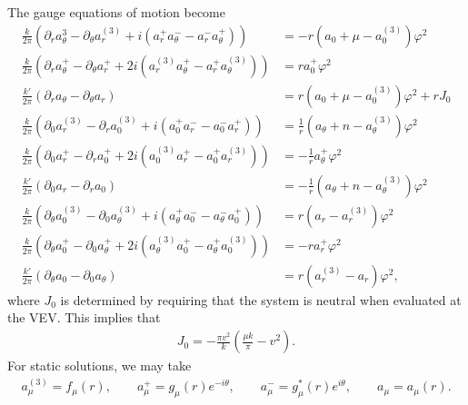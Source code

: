     The gauge equations of motion become
    \begin{align}
        \frac{k}{2 \pi} \left(\partial_{r} a_{\theta}^3 - \partial_{\theta} a_r^{(3)} + i \left(a_r^+ a_{\theta}^- - a_r^- a_{\theta}^{+} \right) \right) &= -r \left( a_0 + \mu - a^{(3)}_0 \right)\varphi^2 \\
        \frac{k}{2 \pi} \left(\partial_r a_{\theta}^{+} - \partial_{\theta} a_r^{+} +2i \left(a_r^{(3)} a_{\theta}^{+} - a_r^{+} a_{\theta}^{(3)} \right) \right) &=r a_0^{+} \varphi^2  \\
        \frac{k'}{2 \pi} \left(\partial_r a_{\theta} - \partial_{\theta} a_r \right) &=r \left(a_0 +\mu - a^{(3)}_0 \right) \varphi^2 + r J_0  \\
        \frac{k}{2 \pi}\left(\partial_{0}a_r^{(3)} - \partial_r a_0^{(3)} + i \left(a_0^+ a_r^- - a_0^- a_r^+  \right)  \right) &= \frac{1}{r} \left(a_{\theta}+n - a_{\theta}^{(3)} \right) \varphi^2  \\
        \frac{k}{2 \pi} \left( \partial_0 a_r^+ - \partial_r a_0^+ + 2i \left( a_0^{(3)} a_r^+ -a_0^+ a_r^{(3)} \right) \right) &= -\frac{1}{r} a_{\theta}^+ \varphi^2  \\
        \frac{k'}{2 \pi} \left( \partial_0 a_r - \partial_r a_0 \right) &= -\frac{1}{r} \left(a_{\theta} +n - a_{\theta}^{(3)} \right) \varphi^2 \\
        \frac{k}{2 \pi} \left(\partial_{\theta} a_0^{(3)} - \partial_0 a_{\theta}^{(3)} + i \left(a_{\theta}^+ a_0^- - a_{\theta}^- a_0^{+} \right) \right) &= r \left(a_r - a_r^{(3)}  \right) \varphi^2 \\
        \frac{k}{2 \pi} \left(\partial_{\theta} a_0^+ - \partial_0 a_{\theta}^+ + 2i \left(a_{\theta}^{(3)} a_0^+ - a_{\theta}^+ a_0^{(3)} \right) \right) &=-r a_r^+ \varphi^2\\
        \frac{k'}{2 \pi} \left(\partial_{\theta}a_0 -\partial_{0} a_{\theta} \right) &= r \left(a_r^{(3)}- a_r \right) \varphi^2,
    \end{align}
    where $J_0$ is determined by requiring that the system is neutral when evaluated at the VEV. This implies that
    \begin{align}
        J_0 = -\frac{\pi v^2}{k} \left(\frac{\mu k}{\pi}- v^2 \right) .
    \end{align}
    For static solutions, we may take
    \begin{align}
        a_{\mu}^{(3)} = f_{\mu}(r), \qquad a_{\mu}^+ = g_{\mu}(r)e^{-i \theta},\qquad a_{\mu}^- = g_{\mu}^*(r) e^{i \theta}, \qquad a_{\mu} = a_{\mu}(r). \label{eq:U2_gauge_ansatz_static}
    \end{align}
